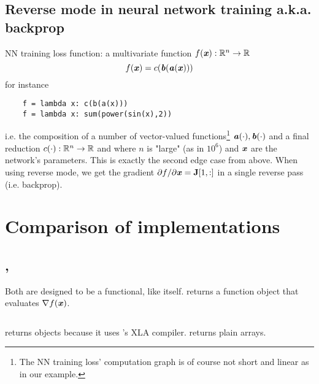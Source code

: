 \documentclass[paper=a4,11pt,headsepline]{scrartcl}
\newcommand{\ipmpy}[1]{\inputminted[xleftmargin=0.9cm]{python}{#1}}
\begin{document}
\subsection{Reverse mode in neural network training a.k.a. backprop}

NN training loss function: a multivariate function $f(\bm{\mathit{x}}): \mathbb R^n\rightarrow \mathbb R$
\begin{equation}
    f(\bm{\mathit{x}}) = c(\bm{\mathit{b}}(\bm{\mathit{a}}(\bm{\mathit{x}})))
\end{equation}
for instance
\begin{verbatim}
    f = lambda x: c(b(a(x)))
    f = lambda x: sum(power(sin(x),2))
\end{verbatim}
i.e. the composition of a number of vector-valued functions\footnote{ The NN
training loss' computation graph is of course not short and linear as in our
example.} $\bm{\mathit{a}}(\cdot), \bm{\mathit{b}}(\cdot)$ and a final reduction $c(\cdot): \mathbb
R^n\rightarrow \mathbb R$ and where $n$ is "large" (as in $10^6$) and $\bm{\mathit{x}}$ are the
network's parameters. This is exactly the second edge case from above. When
using reverse mode, we get the gradient $\partial f/\partial \bm{\mathit{x}} = \bm{\mathbf{J}}[1,:]$ in a
single reverse pass (i.e. backprop).

\section{Comparison of implementations}

\subsection{\jax, \autograd}

Both are designed to be a functional, like \numpy itself.  returns a
function object that evaluates $\nabla f(\bm{\mathit{x}})$.
%
\ipmpy{../talk/code/jax_ad_teaser_grad_usage.py}
%
\jax returns  objects because it uses \tf's XLA compiler.
\autograd returns plain \numpy arrays.
\end{document}
